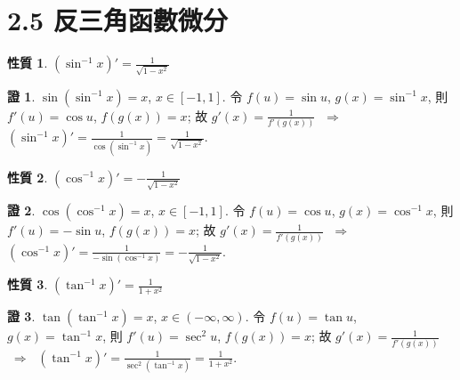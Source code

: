 \documentclass[12pt]{extarticle}
\newcommand{\ds}{\displaystyle}
\newcommand{\ie}{\;\Longrightarrow\;}
\theoremstyle{definition}
\newtheorem*{prp}{性質}
\newtheorem*{prf}{證}
\begin{document}
\section*{2.5 反三角函數微分}

\begin{prp}
  $\ds(\sin^{-1} x)' = \frac{1}{\sqrt{1 - x^2}}$
\end{prp}

\begin{prf}
  $\sin(\sin^{-1}x) = x$, $x\in[-1, 1]$. 令 $f(u) = \sin u$, $g(x) = \sin^{-1} x$, 則 $\ds f'(u) = \cos u$, $\ds f(g(x)) = x$; 故 $\ds g'(x) = \frac{1}{f'(g(x))}$ $\ie$ $\ds(\sin^{-1} x)' = \frac{1}{\cos(\sin^{-1} x)} = \frac{1}{\sqrt{1 - x^2}}$. 
\end{prf}

\begin{prp}
  $\ds(\cos^{-1} x)' = -\frac{1}{\sqrt{1 - x^2}}$
\end{prp}

\begin{prf}
  $\cos(\cos^{-1}x) = x$, $x\in[-1, 1]$. 令 $f(u) = \cos u$, $g(x) = \cos^{-1} x$, 則 $\ds f'(u) = -\sin u$, $\ds f(g(x)) = x$; 故 $\ds g'(x) = \frac{1}{f'(g(x))}$ $\ie$ $\ds(\cos^{-1} x)' = \frac{1}{-\sin(\cos^{-1} x)} = -\frac{1}{\sqrt{1 - x^2}}$. 
\end{prf}

\begin{prp}
  $\ds(\tan^{-1} x)' = \frac{1}{1 + x^2}$
\end{prp}

\begin{prf}
  $\tan(\tan^{-1}x) = x$, $x\in(-\infty, \infty)$. 令 $f(u) = \tan u$, $g(x) = \tan^{-1} x$, 則 $\ds f'(u) = \sec^2 u$, $\ds f(g(x)) = x$; 故 $\ds g'(x) = \frac{1}{f'(g(x))}$ $\ie$ $\ds(\tan^{-1} x)' = \frac{1}{\sec^2(\tan^{-1} x)} = \frac{1}{1 + x^2}$. 
\end{prf}
\end{document}

